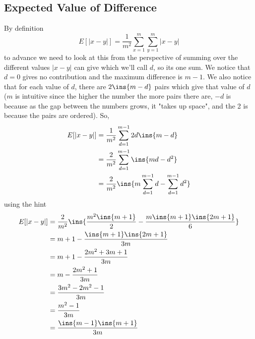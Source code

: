 \subsection{Expected Value of Difference}
By definition
\begin{equation}
    E[|x-y|] = \frac{1}{m^2}\sum_{x=1}^{m}\sum_{y=1}^{m}|x-y|
\end{equation}
to advance we need to look at this from the perspective of summing over the different values \(|x-y|\) can give which we'll call \(d\), so its one sum. We notice that \(d=0\) gives no contribution and the maximum difference is \(m-1\). We also notice that for each value of \(d\), there are \(2\ins{m-d}\) pairs which give that value of \(d\) (\(m\) is intuitive since the higher the number the more pairs there are, \(-d\) is because as the gap between the numbers grows, it "takes up space", and the 2 is because the pairs are ordered). So,
\begin{align}
    E[|x-y|] &= \frac{1}{m^2}\sum_{d=1}^{m-1}2d\ins{m-d}\\
    &= \frac{2}{m^2}\sum_{d=1}^{m-1}\ins{md-d^2}\\
    &= \frac{2}{m^2}\ins{m\sum_{d=1}^{m-1}d-\sum_{d=1}^{m-1}d^2}
\end{align}
using the hint
\begin{align}
    E[|x-y|] &= \frac{2}{m^2}\ins{\frac{m^2\ins{m+1}}{2}-\frac{m\ins{m+1}\ins{2m+1}}{6}}\\
    &= m+1-\frac{\ins{m+1}\ins{2m+1}}{3m}\\
    &= m+1-\frac{2m^2+3m+1}{3m}\\
    &= m-\frac{2m^2+1}{3m}\\
    &= \frac{3m^2-2m^2-1}{3m}\\
    &= \frac{m^2-1}{3m}\\
    &= \frac{\ins{m-1}\ins{m+1}}{3m}
\end{align}